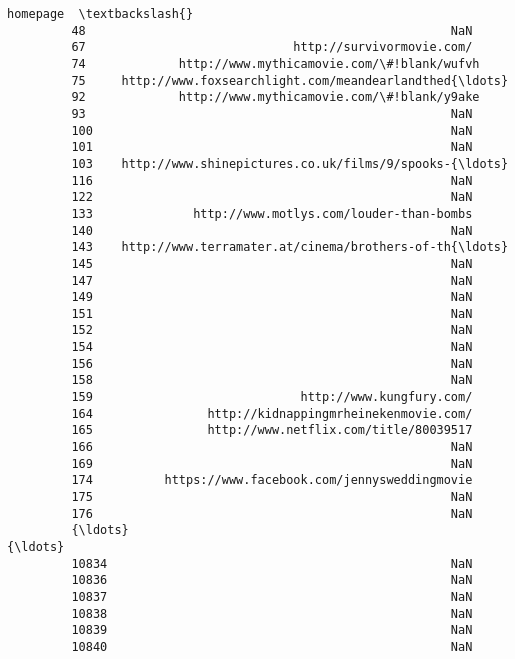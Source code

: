\documentclass[11pt]{article}
\begin{document}
\begin{Verbatim}[commandchars=\\\{\}]
                                                         homepage  \textbackslash{}
         48                                                   NaN   
         67                             http://survivormovie.com/   
         74             http://www.mythicamovie.com/\#!blank/wufvh   
         75     http://www.foxsearchlight.com/meandearlandthed{\ldots}   
         92             http://www.mythicamovie.com/\#!blank/y9ake   
         93                                                   NaN   
         100                                                  NaN   
         101                                                  NaN   
         103    http://www.shinepictures.co.uk/films/9/spooks-{\ldots}   
         116                                                  NaN   
         122                                                  NaN   
         133              http://www.motlys.com/louder-than-bombs   
         140                                                  NaN   
         143    http://www.terramater.at/cinema/brothers-of-th{\ldots}   
         145                                                  NaN   
         147                                                  NaN   
         149                                                  NaN   
         151                                                  NaN   
         152                                                  NaN   
         154                                                  NaN   
         156                                                  NaN   
         158                                                  NaN   
         159                             http://www.kungfury.com/   
         164                http://kidnappingmrheinekenmovie.com/   
         165                http://www.netflix.com/title/80039517   
         166                                                  NaN   
         169                                                  NaN   
         174          https://www.facebook.com/jennysweddingmovie   
         175                                                  NaN   
         176                                                  NaN   
         {\ldots}                                                  {\ldots}   
         10834                                                NaN   
         10836                                                NaN   
         10837                                                NaN   
         10838                                                NaN   
         10839                                                NaN   
         10840                                                NaN   

\end{Verbatim}
\end{document}
